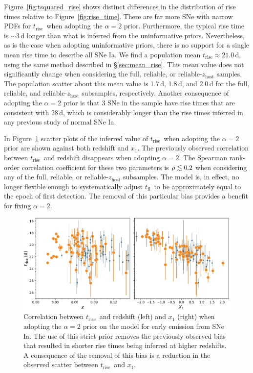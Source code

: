 \documentclass[twocolumn]{./aastex63}
\newcommand{\tfl}{$t_\mathrm{fl}$}
\newcommand{\trise}{$t_\mathrm{rise}$}
\begin{document}
Figure~\ref{fig:tsquared_rise} shows distinct differences in the distribution
of rise times relative to Figure~\ref{fig:rise_time}. There are far more SNe
with narrow PDFs for \trise\ when adopting the $\alpha = 2$ prior.
Furthermore, the typical rise time is $\sim$3\,d longer than what is inferred
from the uninformative priors. Nevertheless, as is the case when adopting
uninformative priors, there is no support for a single mean rise time to
describe all SNe Ia. We find a population mean \trise\;$\approx 21.0$\,d,
using the same method described in \S\ref{sec:mean_rise}. This mean value does
not significantly change when considering the full, reliable, or
reliable-$z_\mathrm{host}$ samples. The population scatter about this mean
value is 1.7\,d, 1.8\,d, and 2.0\,d for the full, reliable, and
reliable-$z_\mathrm{host}$ subsamples, respectively. Another consequence of
adopting the $\alpha = 2$ prior is that 3 SNe in the sample have rise times
that are consistent with 28\,d, which is considerably longer than the rise
times inferred in any previous study of normal SNe Ia.

In Figure~\ref{fig:tsquared_z_evolution} scatter plots of the inferred value
of \trise\ when adopting the $\alpha = 2$ prior are shown against both
redshift and $x_1$. The previously observed correlation between \trise\ and
redshift disappears when adopting $\alpha = 2$. The Spearman rank-order
correlation coefficient for these two parameters is $\rho \lesssim 0.2$ when
considering any of the full, reliable, or reliable-$z_\mathrm{host}$
subsamples. The model is, in effect, no longer flexible enough to
systematically adjust \tfl\ to be approximately equal to the epoch of first
detection. The removal of this particular bias provides a benefit for fixing
$\alpha = 2$.

\begin{figure}
    \centering
    \includegraphics[width=6in]{./figures/trise_z_tsquared.pdf}
    \caption{Correlation between \trise\ and redshift (left) and $x_1$ (right)
    when adopting the $\alpha = 2$ prior on the model for early emission from
    SNe Ia. The use of this strict prior removes the previously observed bias
    that resulted in shorter rise times being inferred at higher redshifts. A
    consequence of the removal of this bias is a reduction in the observed
    scatter between \trise\ and $x_1$.}
    \label{fig:tsquared_z_evolution}
\end{figure}
\end{document}
